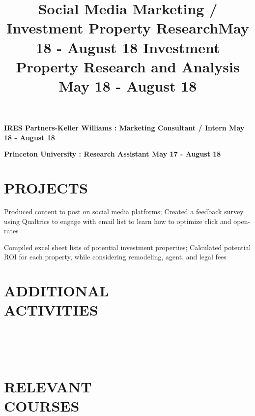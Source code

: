 \documentclass[margin]{res}
\begin{document}
\begin{resume}
\textbf{IRES Partners-Keller Williams : Marketing Consultant / Intern \hfill{May 18 - August 18}\\}

\textbf{Princeton University : Research Assistant \hfill{May 17 - August 18}\\}

\section{PROJECTS}
\location{}
\title{\textbf{Social Media Marketing / Investment Property Research\hfill May 18 - August 18}
 }
\begin{position}
Produced content to post on social media platforms; Created a feedback survey using Qualtrics to engage with email list to learn how to optimize click and open-rates
  

\end{position}

\location{}
\title{\textbf{Investment Property Research and Analysis \hfill May 18 - August 18}
 }

Compiled excel sheet lists of potential investment properties; Calculated potential ROI for each property, while considering remodeling, agent, and legal fees






\section{ADDITIONAL\\ ACTIVITIES}\\
\par
{} 



\section{\\RELEVANT\\COURSES}
\par







\end{resume}

\(\)
\end{document}

